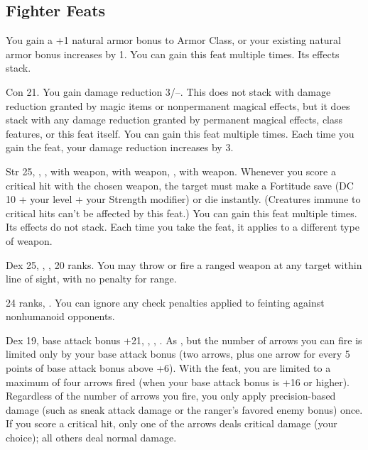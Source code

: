 \subsection{Fighter Feats}
{}{}
{You gain a +1 natural armor bonus to Armor Class, or your existing natural armor bonus increases by 1.}
{}{You can gain this feat multiple times. Its effects stack.}

{}
{Con 21.}
{You gain damage reduction 3/--. This does not stack with damage reduction granted by magic items or nonpermanent magical effects, but it does stack with any damage reduction granted by permanent magical effects, class features, or this feat itself.}
{}{You can gain this feat multiple times. Each time you gain the feat, your damage reduction increases by 3.}

{}
{Str 25, , ,  with weapon,  with weapon, ,  with weapon.}
{Whenever you score a critical hit with the chosen weapon, the target must make a Fortitude save (DC 10 + \onehalf your level + your Strength modifier) or die instantly. (Creatures immune to critical hits can't be affected by this feat.)}
{}{You can gain this feat multiple times. Its effects do not stack. Each time you take the feat, it applies to a different type of weapon.}

{Dex 25, , ,  20 ranks.}
{You may throw or fire a ranged weapon at any target within line of sight, with no penalty for range.}

{ 24 ranks, .}
{You can ignore any check penalties applied to feinting against nonhumanoid opponents.}

{}
{Dex 19, base attack bonus +21, , , .}
{As , but the number of arrows you can fire is limited only by your base attack bonus (two arrows, plus one arrow for every 5 points of base attack bonus above +6).}
{With the  feat, you are limited to a maximum of four arrows fired (when your base attack bonus is +16 or higher).}
{Regardless of the number of arrows you fire, you only apply precision-based damage (such as sneak attack damage or the ranger's favored enemy bonus) once. If you score a critical hit, only one of the arrows deals critical damage (your choice); all others deal normal damage.}

